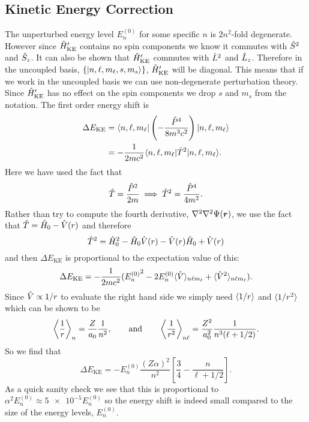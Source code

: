     \subsection{Kinetic Energy Correction}
    The unperturbed energy level \(E_n^{(0)}\) for some specific \(n\) is \(2n^2\)-fold degenerate.
    However since \(\hat{H}'_{\mathrm{KE}}\) contains no spin components we know it commutes with \(\hat{S}^2\) and \(\hat{S}_z\).
    It can also be shown that \(\hat{H}'_{\mathrm{KE}}\) commutes with \(\hat{L}^2\) and \(\hat{L}_z\).
    Therefore in the uncoupled basis, \(\{\vert {n, \ell, m_\ell, s, m_s} \rangle\}\), \(\hat{H}'_{\mathrm{KE}}\) will be diagonal.
    This means that if we work in the uncoupled basis we can use non-degenerate perturbation theory.
    Since \(\hat{H}'_{\mathrm{KE}}\) has no effect on the spin components we drop \(s\) and \(m_s\) from the notation.
    The first order energy shift is
    \begin{align*}
        \Delta E_{\mathrm{KE}} &= \langle {n, \ell, m_\ell} \vert\left(-\frac{\hat{P}^4}{8m^3c^2}\right)\vert {n, \ell, m_\ell} \rangle\\
        &= -\frac{1}{2mc^2}\langle {n, \ell, m_\ell} \vert\hat{T}^2\vert {n, \ell, m_\ell} \rangle.
    \end{align*}
    Here we have used the fact that
    \[\hat{T} = \frac{\hat{P}^2}{2m} \implies \hat{T}^2 = \frac{\hat{P}^4}{4m^2}.\]
    Rather than try to compute the fourth derivative, \(\nabla^2\nabla^2 \Psi(\bm{r})\), we use the fact that \(\hat{T} = \hat{H}_0 - \hat{V}(r)\) and therefore
    \[\hat{T}^2 = \hat{H}_0^2 - \hat{H}_0\hat{V}(r) - \hat{V}(r)\hat{H}_0 + \hat{V}(r)\]
    and then \(\Delta E_{\mathrm{KE}}\) is proportional to the expectation value of this:
    \[\Delta E_{\mathrm{KE}} = -\frac{1}{2mc^2}({E_n^{(0)}}^2 - 2E_n^{(0)}\langle{\hat{V}}\rangle_{n\ell m_\ell} + \langle{\hat{V}^2}\rangle_{n\ell m_\ell}).\]
    Since \(\hat{V} \propto 1/r\) to evaluate the right hand side we simply need \(\langle{1/r}\rangle\) and \(\langle{1/r^2}\rangle\) which can be shown to be
    \[\left\langle {\frac{1}{r}} \right\rangle_{n} = \frac{Z}{a_0}\frac{1}{n^2}, \qquad\text{and}\qquad \left\langle {\frac{1}{r^2}} \right\rangle_{n\ell} = \frac{Z^2}{a_0^2}\frac{1}{n^3(\ell + 1/2)}.\]
    So we find that
    \[\Delta E_{\mathrm{KE}} = -E_n^{(0)}\frac{(Z\alpha)^2}{n^2}\left[\frac{3}{4} - \frac{n}{\ell + 1/2}\right].\]
    As a quick sanity check we see that this is proportional to \(\alpha^2E_n^{(0)} \approx \num{5e-5}E_n^{(0)}\) so the energy shift is indeed small compared to the size of the energy levels, \(E_n^{(0)}\).
    
